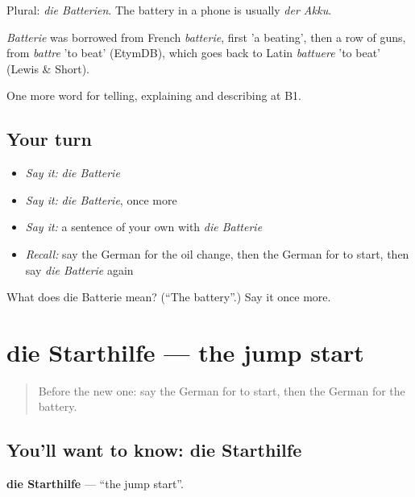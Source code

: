 Plural: \emph{die Batterien}. The battery in a phone is usually \emph{der Akku}.

\begin{cousinweb}
\emph{Batterie} was borrowed from French \emph{batterie}, first 'a beating', then a row of guns, from \emph{battre} 'to beat' (EtymDB), which goes back to Latin \emph{battuere} 'to beat' (Lewis \& Short).
\end{cousinweb}

\begin{grammarlens}[title={What you've built}]
One more word for telling, explaining and describing at B1.
\end{grammarlens}

\subsection*{Your turn}
\begin{itemize}
\raggedright
  \item \emph{Say it:} \emph{die Batterie}
  \item \emph{Say it:} \emph{die Batterie}, once more
  \item \emph{Say it:} a sentence of your own with \emph{die Batterie}
  \item \emph{Recall:} say the German for the oil change, then the German for to start, then say \emph{die Batterie} again
\end{itemize}

\begin{tcolorbox}[breakable,colback=teal!4,colframe=teal!35!black,title={Before you move on}]
What does die Batterie mean? (\textquotedblleft{}The battery\textquotedblright{}.) Say it once more.
\end{tcolorbox}
\section[die Starthilfe]{die Starthilfe — the jump start}

\label{lesson:GE-C403-starthilfe}



\begin{quote}
Before the new one: say the German for to start, then the German for the battery.
\end{quote}

\subsection*{You'll want to know: die Starthilfe}
\textbf{die Starthilfe} — \textquotedblleft{}the jump start\textquotedblright{}.


